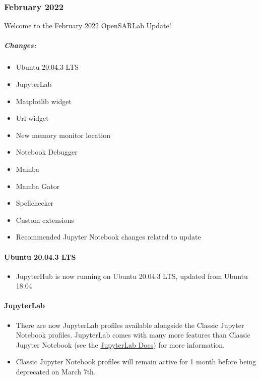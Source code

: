 \subsubsection{February 2022}

Welcome to the February 2022 OpenSARLab Update!

\subparagraph{Changes:}

\begin{itemize}
\item Ubuntu 20.04.3 LTS
\item JupyterLab
\item Matplotlib widget
\item Url-widget
\item New memory monitor location
\item Notebook Debugger
\item Mamba
\item Mamba Gator
\item Spellchecker
\item Custom extensions
\item Recommended Jupyter Notebook changes related to update
\end{itemize}

\paragraph{Ubuntu 20.04.3 LTS}

\begin{itemize}
\item JupyterHub is now running on Ubuntu 20.04.3 LTS, updated from Ubuntu 18.04
\end{itemize}

\paragraph{JupyterLab}

\begin{itemize}
\item There are now JupyterLab profiles available alongside the Classic Jupyter Notebook profiles. JupyterLab comes with many more features than Classic Jupyter Notebook (see the \href{https://jupyterlab.readthedocs.io/en/stable/user/interface.html}{JupyterLab Docs}) for more information.
\item Classic Jupyter Notebook profiles will remain active for 1 month before being deprecated on March 7th.
\end{itemize}

